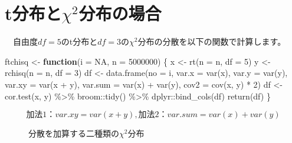 \documentclass[a4paper]{tufte-handout}
\newenvironment{Shaded}{}{}
\newcommand{\AttributeTok}[1]{\textcolor[rgb]{0.49,0.56,0.16}{#1}}
\newcommand{\ConstantTok}[1]{\textcolor[rgb]{0.53,0.00,0.00}{#1}}
\newcommand{\ControlFlowTok}[1]{\textcolor[rgb]{0.00,0.44,0.13}{\textbf{#1}}}
\newcommand{\DecValTok}[1]{\textcolor[rgb]{0.25,0.63,0.44}{#1}}
\newcommand{\FunctionTok}[1]{\textcolor[rgb]{0.02,0.16,0.49}{#1}}
\newcommand{\NormalTok}[1]{#1}
\newcommand{\OtherTok}[1]{\textcolor[rgb]{0.00,0.44,0.13}{#1}}
\newcommand{\SpecialCharTok}[1]{\textcolor[rgb]{0.25,0.44,0.63}{#1}}
\begin{document}
\newpage

\hypertarget{tux5206ux5e03ux3068chi2ux5206ux5e03ux306eux5834ux5408}{%
\section{\texorpdfstring{\textbf{t分布と\(\chi^2\)分布の場合}}{t分布と\textbackslash chi\^{}2分布の場合}}\label{tux5206ux5e03ux3068chi2ux5206ux5e03ux306eux5834ux5408}}

　自由度\(df = 5\)のt分布と\(df = 3\)の\(\chi^2\)分布の分散を以下の関数で計算します。

\begin{Shaded}
\begin{Highlighting}[numbers=left,,]
\NormalTok{ftchisq }\OtherTok{\textless{}{-}} \ControlFlowTok{function}\NormalTok{(}\AttributeTok{i =} \ConstantTok{NA}\NormalTok{, }\AttributeTok{n =} \DecValTok{5000000}\NormalTok{) \{}
\NormalTok{  x }\OtherTok{\textless{}{-}} \FunctionTok{rt}\NormalTok{(}\AttributeTok{n =}\NormalTok{ n, }\AttributeTok{df =} \DecValTok{5}\NormalTok{)}
\NormalTok{  y }\OtherTok{\textless{}{-}} \FunctionTok{rchisq}\NormalTok{(}\AttributeTok{n =}\NormalTok{ n, }\AttributeTok{df =} \DecValTok{3}\NormalTok{)}
\NormalTok{  df }\OtherTok{\textless{}{-}} \FunctionTok{data.frame}\NormalTok{(}\AttributeTok{no =}\NormalTok{ i,}
                   \AttributeTok{var.x =} \FunctionTok{var}\NormalTok{(x), }\AttributeTok{var.y =} \FunctionTok{var}\NormalTok{(y),}
                   \AttributeTok{var.xy =} \FunctionTok{var}\NormalTok{(x }\SpecialCharTok{+}\NormalTok{ y), }\AttributeTok{var.sum =} \FunctionTok{var}\NormalTok{(x) }\SpecialCharTok{+} \FunctionTok{var}\NormalTok{(y),}
                   \AttributeTok{cov2 =} \FunctionTok{cov}\NormalTok{(x, y) }\SpecialCharTok{*} \DecValTok{2}\NormalTok{)}
\NormalTok{  df }\OtherTok{\textless{}{-}} \FunctionTok{cor.test}\NormalTok{(x, y) }\SpecialCharTok{\%\textgreater{}\%}\NormalTok{ broom}\SpecialCharTok{::}\FunctionTok{tidy}\NormalTok{() }\SpecialCharTok{\%\textgreater{}\%}\NormalTok{ dplyr}\SpecialCharTok{::}\FunctionTok{bind\_cols}\NormalTok{(df)}
  \FunctionTok{return}\NormalTok{(df)}
\NormalTok{\}}
\end{Highlighting}
\end{Shaded}

\[\mbox{加法1：}var.xy = var(x + y),　\mbox{加法2：}var.sum = var(x) + var(y)\]

\begin{figure}

{\centering {}

}

\caption[分散を加算する二種類の$\chi^2$分布]{分散を加算する二種類の$\chi^2$分布}\label{fig:unnamed-chunk-15}
\end{figure}
\end{document}
